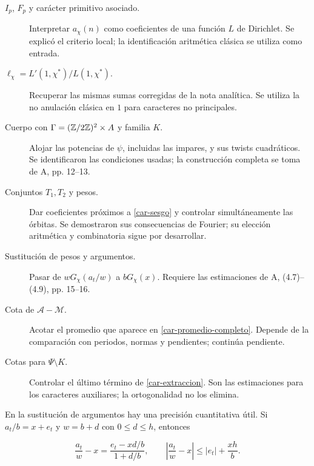 \begingroup
\raggedright
\begin{description}
\item[$I_p$, $F_p$ y carácter primitivo asociado.] Interpretar $a_\chi(n)$ como coeficientes de una función $L$ de Dirichlet. Se explicó el criterio local; la identificación aritmética clásica se utiliza como entrada.

\item[$\ell_\chi=L'(1,\chi^*)/L(1,\chi^*)$.] Recuperar las mismas sumas corregidas de la nota analítica. Se utiliza la no anulación clásica en $1$ para caracteres no principales.

\item[Cuerpo con $\Gamma=(\mathbb{Z}/2\mathbb{Z})^2\times A$ y familia $K$.] Alojar las potencias de $\psi$, incluidas las impares, y sus twists cuadráticos. Se identificaron las condiciones usadas; la construcción completa se toma de A, pp. 12–13.

\item[Conjuntos $T_1,T_2$ y pesos.] Dar coeficientes próximos a \eqref{car-sesgo} y controlar simultáneamente las órbitas. Se demostraron sus consecuencias de Fourier; su elección aritmética y combinatoria sigue por desarrollar.

\item[Sustitución de pesos y argumentos.] Pasar de $wG_\chi(a_t/w)$ a $bG_\chi(x)$. Requiere las estimaciones de A, (4.7)–(4.9), pp. 15–16.

\item[Cota de $\mathcal A-\mathcal M$.] Acotar el promedio que aparece en \eqref{car-promedio-completo}. Depende de la comparación con periodos, normas y pendientes; continúa pendiente.

\item[Cotas para $\Psi\setminus K$.] Controlar el último término de \eqref{car-extraccion}. Son las estimaciones para los caracteres auxiliares; la ortogonalidad no los elimina.

\end{description}
\par
\endgroup

En la sustitución de argumentos hay una precisión cuantitativa útil. Si $a_t/b=x+e_t$ y $w=b+d$ con $0\le d\le h$, entonces

\begin{equation}
\frac{a_t}{w}-x=\frac{e_t-xd/b}{1+d/b},
\qquad
\left|\frac{a_t}{w}-x\right|\le |e_t|+\frac{xh}{b}.
\label{car-cambio-argumento}
\end{equation}

